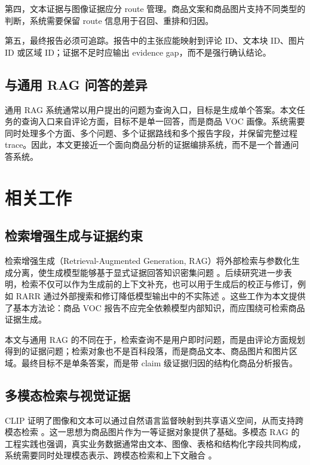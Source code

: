 \documentclass[11pt]{article}
\begin{document}
第四，文本证据与图像证据应分 route 管理。商品文案和商品图片支持不同类型的判断，系统需要保留 route 信息用于召回、重排和归因。

第五，最终报告必须可追踪。报告中的主张应能映射到评论 ID、文本块 ID、图片 ID 或区域 ID；证据不足时应输出 evidence gap，而不是强行确认结论。

\subsection{与通用 RAG 问答的差异}

通用 RAG 系统通常以用户提出的问题为查询入口，目标是生成单个答案。本文任务的查询入口来自评论方面，目标不是单一回答，而是商品 VOC 画像。系统需要同时处理多个方面、多个问题、多个证据路线和多个报告字段，并保留完整过程 trace。因此，本文更接近一个面向商品分析的证据编排系统，而不是一个普通问答系统。

\section{相关工作}
\subsection{检索增强生成与证据约束}

检索增强生成（Retrieval-Augmented Generation, RAG）将外部检索与参数化生成分离，使生成模型能够基于显式证据回答知识密集问题 \citep{lewis2020retrievalAugmentedGeneration}。后续研究进一步表明，检索不仅可以作为生成前的上下文补充，也可以用于生成后的校正与修订，例如 RARR 通过外部搜索和修订降低模型输出中的不实陈述 \citep{gao2023rarr}。这些工作为本文提供了基本方法论：商品 VOC 报告不应完全依赖模型内部知识，而应围绕可检索商品证据生成。

本文与通用 RAG 的不同在于，检索查询不是用户即时问题，而是由评论方面规划得到的证据问题；检索对象也不是百科段落，而是商品文本、商品图片和图片区域。最终目标不是单条答案，而是带 claim 级证据归因的结构化商品分析报告。

\subsection{多模态检索与视觉证据}

CLIP 证明了图像和文本可以通过自然语言监督映射到共享语义空间，从而支持跨模态检索 \citep{radford2021clip}。这一思想为商品图片作为一等证据对象提供了基础。多模态 RAG 的工程实践也强调，真实业务数据通常由文本、图像、表格和结构化字段共同构成，系统需要同时处理模态表示、跨模态检索和上下文融合 \citep{nvidia2024multimodalRagIntro,nvidia2024aiReadyKnowledgeSystems}。
\end{document}
